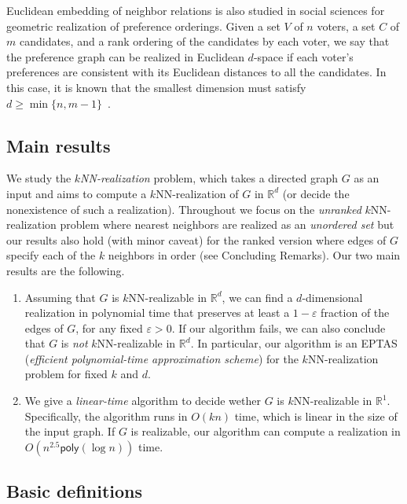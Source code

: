 \documentclass[english]{lipics-v2021}
\begin{document}
Euclidean embedding of neighbor relations is also studied in social sciences for geometric realization of preference orderings. Given a set $V$ of $n$ voters, a set $C$ of $m$ candidates, and a rank ordering of the candidates by each voter, we say that the preference graph can be realized in Euclidean $d$-space if each voter's preferences are consistent with its Euclidean distances to all the candidates. In this case, it is known that the smallest dimension must satisfy $d \geq \min \{n , m-1\}$~\cite{bogomolnaia:2007}.

\subsection{Main results}

We study the \textit{$k$NN-realization} problem, which takes a directed graph $G$ as an input and aims to compute a $k$NN-realization of $G$ in $\mathbb{R}^d$ (or decide the nonexistence of such a realization).
Throughout we focus on the \emph{unranked} $k$NN-realization problem where nearest neighbors are realized as an \emph{unordered set} but our results also hold (with minor caveat) for the ranked version where edges of $G$ specify each of the $k$ neighbors in order (see Concluding Remarks). 
Our two main results are the following.

\begin{enumerate}
\item Assuming that $G$ is $k$NN-realizable in $\mathbb{R}^d$, we can find a $d$-dimensional realization in polynomial time that preserves at least a $1 - \varepsilon$ fraction of the edges of $G$, for any fixed $\varepsilon > 0$.
If our algorithm fails, we can also conclude that $G$ is \emph{not} $k$NN-realizable in $\mathbb{R}^d$.
In particular, our algorithm is an EPTAS (\textit{efficient polynomial-time approximation scheme}) for the $k$NN-realization problem for fixed $k$ and $d$.

\smallskip

\item We give a \textit{linear-time} algorithm to decide wether $G$ is $k$NN-realizable in $\mathbb{R}^1$.
Specifically, the algorithm runs in $O(kn)$ time, which is linear in the size of the input graph.
If $G$ is realizable, our algorithm can compute a realization in $O(n^{2.5} \mathsf{poly}(\log n))$ time.
\end{enumerate}

\subsection{Basic definitions}
\end{document}
